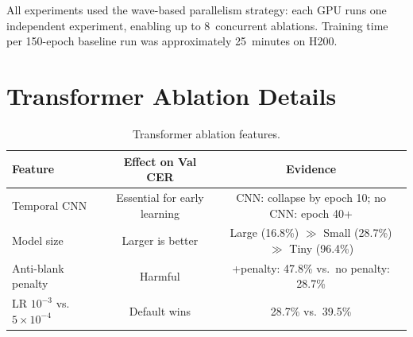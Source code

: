 \documentclass{article}
\begin{document}
All experiments used the wave-based parallelism strategy: each GPU runs one independent experiment, enabling up to 8~concurrent ablations. Training time per 150-epoch baseline run was approximately 25~minutes on H200.


\section{Transformer Ablation Details}

\begin{table}[h]
\centering
\small
\caption{Transformer ablation features.}
\begin{tabular}{lcc}
\toprule
\textbf{Feature} & \textbf{Effect on Val CER} & \textbf{Evidence} \\
\midrule
Temporal CNN & Essential for early learning & CNN: collapse by epoch 10; no CNN: epoch 40+ \\
Model size & Larger is better & Large (16.8\%) $\gg$ Small (28.7\%) $\gg$ Tiny (96.4\%) \\
Anti-blank penalty & Harmful & +penalty: 47.8\% vs.\ no penalty: 28.7\% \\
LR $10^{-3}$ vs.\ $5{\times}10^{-4}$ & Default wins & 28.7\% vs.\ 39.5\% \\
\bottomrule
\end{tabular}
\end{table}
\end{document}
